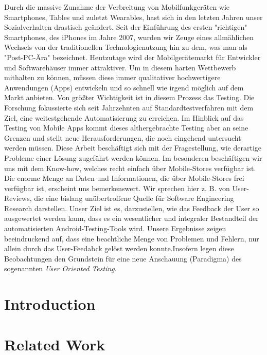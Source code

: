 \documentclass{seal_thesis}
\begin{document}
\begin{zusammenfassung}
Durch die massive Zunahme der Verbreitung von Mobilfunkgeräten wie Smartphones, Tables und zuletzt Wearables, hast sich in den letzten Jahren unser Sozialverhalten drastisch geändert. Seit der Einführung des ersten "richtigen" Smartphones, des iPhones im Jahre 2007, wurden wir Zeuge eines allmählichen Wechsels von der traditionellen Technologienutzung hin zu dem, was man als "Post-PC-Ära" bezeichnet. Heutzutage wird der Mobilgerätemarkt für Entwickler und Softwarehäuser immer attraktiver. Um in diesem harten Wettbewerb mithalten zu können, müssen diese immer qualitativer hochwertigere Anwendungen (Apps) entwickeln und so schnell wie irgend möglich auf dem Markt anbieten. Von größter Wichtigkeit ist in diesem Prozess das Testing. Die Forschung fokussierte sich seit Jahrzehnten auf Standardtestverfahren mit dem Ziel, eine weitestgehende Automatisierung zu erreichen. Im Hinblick auf das Testing von Mobile Apps kommt dieses althergebrachte Testing aber an seine Grenzen und stellt neue Herausforderungen, die noch eingehend untersucht werden müssen. Diese Arbeit beschäftigt sich mit der Fragestellung, wie derartige Probleme einer Lösung zugeführt werden können. Im besonderen beschäftigen wir uns mit dem Know-how, welches recht einfach über Mobile-Stores verfügbar ist. Die enorme Menge an Daten und Informationen, die über Mobile-Stores frei verfügbar ist, erscheint uns bemerkenswert. Wir sprechen hier z. B. von User-Reviews, die eine bislang unübertroffene Quelle für Software Engineering Research darstellen. Unser Ziel ist es, darzustellen, wie das Feedback der User so ausgewertet werden kann, dass es ein wesentlicher und integraler Bestandteil der automatisierten Android-Testing-Tools wird.
Unsere Ergebnisse zeigen beeindruckend auf, dass eine beachtliche Menge von Problemen und Fehlern, nur allein durch das User-Feedabck gelöst werden konnte.Insofern legen diese Beobachtungen den Grundstein für eine neue Anschauung (Paradigma) des sogenannten \textit{User Oriented Testing}.
\end{zusammenfassung}

\tableofcontents
\listoffigures
\listoftables
\lstlistoflistings

\mainmatter
\chapter{Introduction}
\label{sec:intro}


\chapter{Related Work}
\label{sec:related}

\end{document}
